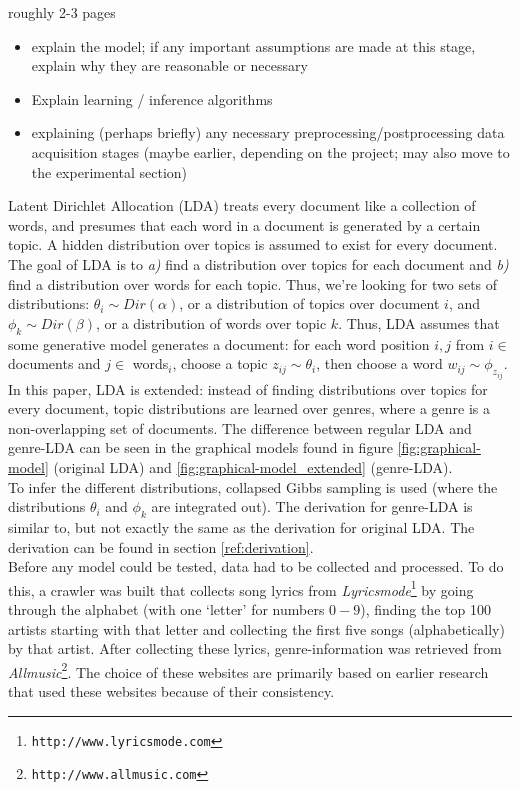 roughly 2-3 pages
\begin{itemize}
\item explain the model; if any important assumptions are made at this stage, explain why they are reasonable or necessary
\item Explain learning / inference algorithms
\item explaining (perhaps briefly) any necessary preprocessing/postprocessing data acquisition stages (maybe earlier, depending on the project; may also move to the experimental section)
\end{itemize}
Latent Dirichlet Allocation (LDA) treats every document like a collection of words, and presumes that each word in a document is generated by a certain topic. A hidden distribution over topics is assumed to exist for every document. The goal of LDA is to \textit{a)} find a distribution over topics for each document and \textit{b)} find a distribution over words for each topic. Thus, we're looking for two sets of distributions: $\theta_i \sim Dir(\alpha)$, or a distribution of topics over document $i$, and $\phi_k \sim Dir(\beta)$, or a distribution of words over topic $k$. Thus, LDA assumes that some generative model generates a document: for each word position $i,j$ from $i \in$ documents and $j \in$ words$_i$, choose a topic $z_{ij} \sim \theta_i$, then choose a word $w_{ij} \sim \phi_{z_{ij}}$. \\
In this paper, LDA is extended: instead of finding distributions over topics for every document, topic distributions are learned over genres, where a genre is a non-overlapping set of documents. The difference between regular LDA and genre-LDA can be seen in the graphical models found in figure \ref{fig:graphical-model} (original LDA) and \ref{fig:graphical-model_extended} (genre-LDA). \\
To infer the different distributions, collapsed Gibbs sampling is used (where the distributions $\theta_i$ and $\phi_k$ are integrated out). The derivation for genre-LDA is similar to, but not exactly the same as the derivation for original LDA. The derivation can be found in section \ref{ref:derivation}.\\
Before any model could be tested, data had to be collected and processed. To do this, a crawler was built that collects song lyrics from \textit{Lyricsmode}\footnote{\texttt{http://www.lyricsmode.com}} by going through the alphabet (with one `letter' for numbers $0-9$), finding the top 100 artists starting with that letter and collecting the first five songs (alphabetically) by that artist. After collecting these lyrics, genre-information was retrieved from \textit{Allmusic}\footnote{\texttt{http://www.allmusic.com}}. The choice of these websites are primarily based on earlier research \cite{felllyrics} that used these websites because of their consistency. \\
